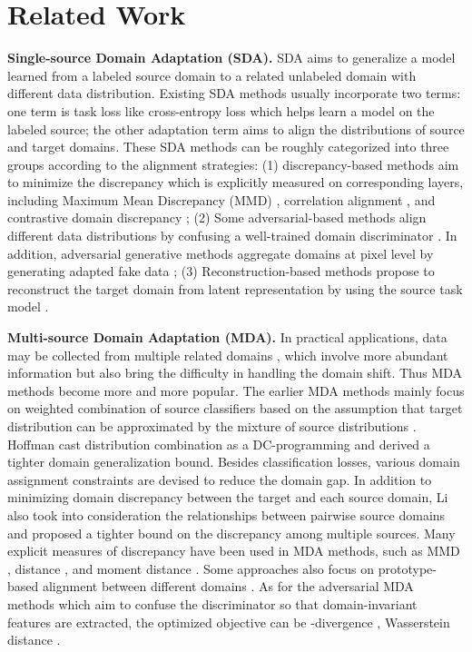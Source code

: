 \documentclass[10pt,twocolumn,letterpaper]{article}
\begin{document}
\section{Related Work}
\label{sec2}
\textbf{Single-source Domain Adaptation (SDA).} SDA aims to generalize a model learned from a labeled source domain to a related unlabeled domain with different data distribution. Existing SDA methods usually incorporate two terms: one term is task loss like cross-entropy loss which helps learn a model on the labeled source; the other adaptation term aims to align the distributions of source and target domains. These SDA methods can be roughly categorized into three groups according to the alignment strategies: (1) discrepancy-based methods aim to minimize the discrepancy which is explicitly measured on corresponding layers, including Maximum Mean Discrepancy (MMD) \cite{long2015learning}, correlation alignment \cite{sun2017correlation}, and contrastive domain discrepancy \cite{kang2019contrastive}; (2) Some adversarial-based methods align different data distributions by confusing a well-trained domain discriminator \cite{tzeng2017adversarial,tsai2018learning}. In addition, adversarial generative methods aggregate domains at pixel level by generating adapted fake data \cite{zhu2017unpaired}; (3) Reconstruction-based methods propose to reconstruct the target domain from latent representation by using the source task model \cite{ghifary2016deep}. \par
\textbf{Multi-source Domain Adaptation (MDA).} In practical applications, data may be collected from multiple related domains \cite{bhatt2016multi,sun2015survey}, which involve more abundant information but also bring the difficulty in handling the domain shift. Thus MDA methods become more and more popular. The earlier MDA methods mainly focus on weighted combination of source classifiers \cite{hoffman2018algorithms,li2018extracting,lee2019sliced,saito2018maximum} based on the assumption that target distribution can be approximated by the mixture of source distributions \cite{blitzer2007learning,ben-david2010a}. Hoffman \etal \cite{hoffman2018algorithms} cast distribution combination as a DC-programming and derived a tighter domain generalization bound. Besides classification losses, various domain assignment constraints are devised to reduce the domain gap. In addition to minimizing domain discrepancy between the target and each source domain, Li \etal \cite{li2018extracting} also took into consideration the relationships between pairwise source domains and proposed a tighter bound on the discrepancy among multiple sources. Many explicit measures of discrepancy have been used in MDA methods, such as MMD \cite{guo2018multi},  distance \cite{rakshit2019unsupervised}, and moment distance \cite{peng2019moment}. Some approaches also focus on prototype-based alignment between different domains \cite{pan2019transferrable,xie2018learning,wang2020learning}. As for the adversarial MDA methods which aim to confuse the discriminator so that domain-invariant features are extracted, the optimized objective can be -divergence \cite{zhao2018adversarial}, Wasserstein distance \cite{zhao2020multi,li2018extracting}. \par
\end{document}
